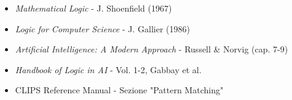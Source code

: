 \begin{itemize}
\item \textit{Mathematical Logic} - J. Shoenfield (1967)
\item \textit{Logic for Computer Science} - J. Gallier (1986)
\item \textit{Artificial Intelligence: A Modern Approach} - Russell \& Norvig (cap. 7-9)
\item \textit{Handbook of Logic in AI} - Vol. 1-2, Gabbay et al.
\item CLIPS Reference Manual - Sezione "Pattern Matching"
\end{itemize}
